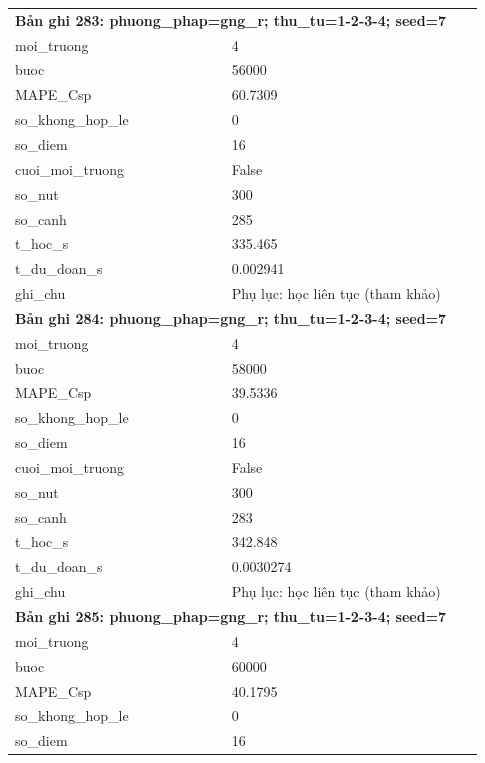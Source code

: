 \begin{longtable}{p{0.43\linewidth}p{0.50\linewidth}}
\midrule
\multicolumn{2}{p{0.95\linewidth}}{\textbf{Bản ghi 283: phuong\_phap=gng\_r; thu\_tu=1-2-3-4; seed=7}} \\
moi\_\allowbreak truong & 4 \\
buoc & 56000 \\
MAPE\_\allowbreak Csp & 60.7309 \\
so\_\allowbreak khong\_\allowbreak hop\_\allowbreak le & 0 \\
so\_\allowbreak diem & 16 \\
cuoi\_\allowbreak moi\_\allowbreak truong & False \\
so\_\allowbreak nut & 300 \\
so\_\allowbreak canh & 285 \\
t\_\allowbreak hoc\_\allowbreak s & 335.465 \\
t\_\allowbreak du\_\allowbreak doan\_\allowbreak s & 0.002941 \\
ghi\_\allowbreak chu & Phụ lục: học liên tục (tham khảo) \\
\midrule
\multicolumn{2}{p{0.95\linewidth}}{\textbf{Bản ghi 284: phuong\_phap=gng\_r; thu\_tu=1-2-3-4; seed=7}} \\
moi\_\allowbreak truong & 4 \\
buoc & 58000 \\
MAPE\_\allowbreak Csp & 39.5336 \\
so\_\allowbreak khong\_\allowbreak hop\_\allowbreak le & 0 \\
so\_\allowbreak diem & 16 \\
cuoi\_\allowbreak moi\_\allowbreak truong & False \\
so\_\allowbreak nut & 300 \\
so\_\allowbreak canh & 283 \\
t\_\allowbreak hoc\_\allowbreak s & 342.848 \\
t\_\allowbreak du\_\allowbreak doan\_\allowbreak s & 0.0030274 \\
ghi\_\allowbreak chu & Phụ lục: học liên tục (tham khảo) \\
\midrule
\multicolumn{2}{p{0.95\linewidth}}{\textbf{Bản ghi 285: phuong\_phap=gng\_r; thu\_tu=1-2-3-4; seed=7}} \\
moi\_\allowbreak truong & 4 \\
buoc & 60000 \\
MAPE\_\allowbreak Csp & 40.1795 \\
so\_\allowbreak khong\_\allowbreak hop\_\allowbreak le & 0 \\
so\_\allowbreak diem & 16 \\

\end{longtable}
